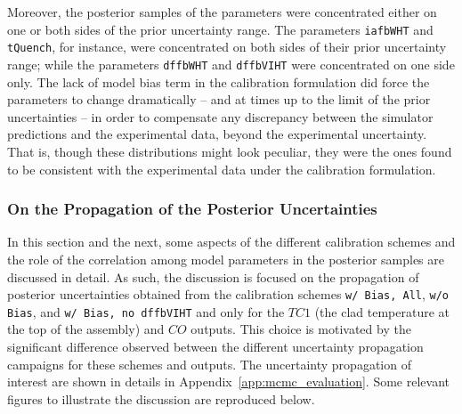 Moreover, the posterior samples of the parameters were concentrated either on one or both sides of the prior uncertainty range.
The parameters \texttt{iafbWHT} and \texttt{tQuench}, for instance, were concentrated on both sides of their prior uncertainty range;
while the parameters \texttt{dffbWHT} and \texttt{dffbVIHT} were concentrated on one side only.
The lack of model bias term in the calibration formulation did force the parameters to change dramatically -- and at times up to the limit of the prior uncertainties -- in order to compensate any discrepancy between the simulator predictions and the experimental data, beyond the experimental uncertainty.
That is, though these distributions might look peculiar, they were the ones found to be consistent with the experimental data under the calibration formulation.

\subsubsection{On the Propagation of the Posterior Uncertainties}\label{subsub:bc_discussion_posterior_propagation}

In this section and the next, some aspects of the different calibration schemes and the role of the correlation among model parameters in the posterior samples are discussed in detail. 
As such, the discussion is focused on the propagation of posterior uncertainties obtained from the calibration schemes \texttt{w/ Bias, All}, \texttt{w/o Bias}, and \texttt{w/ Bias, no dffbVIHT}  
and only for the $TC1$ (the clad temperature at the top of the assembly) and $CO$ outputs. 
This choice is motivated by the significant difference observed between the different uncertainty propagation campaigns for these schemes and outputs.
The uncertainty propagation of interest are shown in details in Appendix~\ref{app:mcmc_evaluation}.
Some relevant figures to illustrate the discussion are reproduced below.


